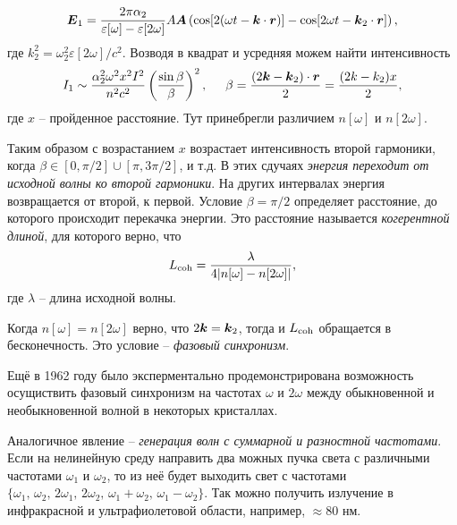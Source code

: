 \begin{equation*}
    \mbox{\boldmath $E$}_1 = \frac{2 \pi \alpha_2}{\varepsilon[\omega]-\varepsilon[2\omega]} A \mbox{\boldmath $A$} \left(
        \cos[2(\omega t - \mbox{\boldmath $k$} \cdot \mbox{\boldmath $r$})] - \cos[2 \omega t - \mbox{\boldmath $k$}_2 \cdot \mbox{\boldmath $r$}]
    \right),
\end{equation*}
где $k_2^2 = \omega_2^2 \varepsilon[2\omega]/c^2$. Возводя в квадрат и усредняя можем найти интенсивность
\begin{equation*}
    I_1 \sim \frac{\alpha_2^2 \omega^2 x^2 I^2}{n^2 c^2} \left(\frac{\sin \beta}{\beta}\right)^2,
    \hspace{5 mm} 
    \beta = \frac{(2\mbox{\boldmath $k$} - \mbox{\boldmath $k$}_2)\cdot \mbox{\boldmath $r$} }{2} = \frac{(2k-k_2)x}{2},
\end{equation*}
где $x$ -- пройденное расстояние. Тут принебрегли различием $n[\omega]$ и $n[2\omega]$. 


Таким образом с возрастанием $x$ возрастает интенсивность второй гармоники, когда $\beta \in [0, \pi/2]\cup[\pi, 3\pi/2]$, и т.д. В этих сдучаях \textit{энергия переходит от исходной волны ко второй гармоники}. На других интервалах энергия возвращается от второй, к первой. Условие $\beta=\pi/2$ определяет расстояние, до которого происходит перекачка энергии. Это расстояние называется \textit{когерентной длиной}, для которого верно, что
\begin{equation*}
    L_{\textnormal{coh}} = \frac{\lambda}{4|n[\omega]-n[2\omega]|},
\end{equation*}
где $\lambda$ -- длина исходной волны. 

Когда $n[\omega]=n[2\omega]$ верно, что $2 \mbox{\boldmath $k$} = \mbox{\boldmath $k$}_2$, тогда и $L_{\textnormal{coh}}$ обращается в бесконечность. Это условие -- \textit{фазовый синхронизм}. 


Ещё в 1962 году было эксперментально продемонстрирована возможность осущиствить фазовый синхронизм на частотах $\omega$ и $2 \omega$ между обыкновенной и необыкновенной волной в некоторых кристаллах. 


Аналогичное явление -- \textit{генерация волн с суммарной и разностной частотами}. Если на нелинейную среду направить два можных пучка света с различными частотами $\omega_1$ и $\omega_2$, то из неё будет выходить свет с частотами $\{\omega_1,\, \omega_2,\, 2 \omega_1,\, 2 \omega_2,\, \omega_1+\omega_2,\, \omega_1-\omega_2\}$. Так можно получить излучение в инфракрасной и ультрафиолетовой области, например, $\approx 80$ нм. 